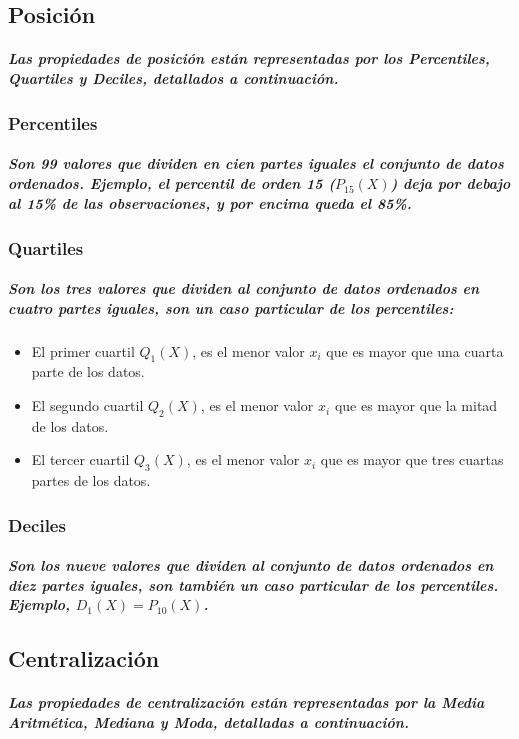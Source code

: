 \subsection{Posición}
\subparagraph{
Las propiedades de posición están representadas por los Percentiles, Quartiles y Deciles, detallados a continuación.
}

\subsubsection{Percentiles}
\subparagraph{
Son 99 valores que dividen en cien partes iguales el conjunto de datos ordenados. Ejemplo, el percentil de orden 15  ($P_{15}(X)$) deja por debajo al 15\% de las observaciones, y por encima queda el 85\%.
}

\subsubsection{Quartiles}
\subparagraph{
Son los tres valores que dividen al conjunto de datos ordenados en cuatro partes iguales, son un caso particular de los percentiles:
}
\begin{itemize}
\item El primer cuartil $Q_{1}(X)$, es el menor valor $x_{i}$ que es mayor que una cuarta parte de los datos.
\item El segundo cuartil $Q_{2}(X)$, es el menor valor $x_{i}$ que es mayor que la mitad de los datos.
\item El tercer cuartil $Q_{3}(X)$, es el menor valor $x_{i}$ que es mayor que tres cuartas partes de los datos.
\end{itemize}

\subsubsection{Deciles}
\subparagraph{
Son los nueve valores que dividen al conjunto de datos ordenados en diez partes iguales, son también un caso particular de los percentiles. Ejemplo, $D_{1}(X) = P_{10}(X)$.
}


\subsection{Centralización}
\subparagraph{
Las propiedades de centralización están representadas por la Media Aritmética, Mediana y Moda, detalladas a continuación.
}

